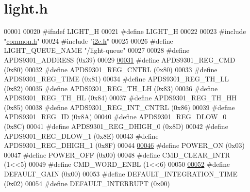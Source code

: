 \hypertarget{light_8h_source}{}\section{light.\+h}
\label{light_8h_source}

\begin{DoxyCode}
00001 
00020 \textcolor{preprocessor}{#ifndef LIGHT\_H}
00021 \textcolor{preprocessor}{#define LIGHT\_H}
00022 
00023 \textcolor{preprocessor}{#include "\hyperlink{common_8h}{common.h}"}
00024 \textcolor{preprocessor}{#include "\hyperlink{i2c_8h}{i2c.h}"}
00025 
00026 \textcolor{preprocessor}{#define LIGHT\_QUEUE\_NAME "/light-queue"}
00027 
00028 \textcolor{preprocessor}{#define APDS9301\_ADDRESS         (0x39)}
00029 
\hyperlink{light_8h_ac2e33218e7b5df546d974d0c766d8b0b}{00031} \textcolor{preprocessor}{#define APDS9301\_REG\_CMD         (0x80)}
00032 \textcolor{preprocessor}{#define APDS9301\_REG\_CNTRL       (0x80)}
00033 \textcolor{preprocessor}{#define APDS9301\_REG\_TIME        (0x81)}
00034 \textcolor{preprocessor}{#define APDS9301\_REG\_TH\_LL       (0x82)}
00035 \textcolor{preprocessor}{#define APDS9301\_REG\_TH\_LH       (0x83)}
00036 \textcolor{preprocessor}{#define APDS9301\_REG\_TH\_HL       (0x84)}
00037 \textcolor{preprocessor}{#define APDS9301\_REG\_TH\_HH       (0x85)}
00038 \textcolor{preprocessor}{#define APDS9301\_REG\_INT\_CNTRL   (0x86)}
00039 \textcolor{preprocessor}{#define APDS9301\_REG\_ID          (0x8A)}
00040 \textcolor{preprocessor}{#define APDS9301\_REG\_DLOW\_0      (0x8C)}
00041 \textcolor{preprocessor}{#define APDS9301\_REG\_DHIGH\_0     (0x8D)}
00042 \textcolor{preprocessor}{#define APDS9301\_REG\_DLOW\_1      (0x8E)}
00043 \textcolor{preprocessor}{#define APDS9301\_REG\_DHIGH\_1     (0x8F)}
00044 
\hyperlink{light_8h_a14cdc4396ca692461b59fb937003115b}{00046} \textcolor{preprocessor}{#define POWER\_ON     (0x03)}
00047 \textcolor{preprocessor}{#define POWER\_OFF    (0x00)}
00048 \textcolor{preprocessor}{#define CMD\_CLEAR\_INTR  (1<<5)}
00049 \textcolor{preprocessor}{#define CMD\_WORD\_ENBL   (1<<6)}
00050 
\hyperlink{light_8h_ae242ab0e0a91e95de561944085dbdf20}{00052} \textcolor{preprocessor}{#define DEFAULT\_GAIN             (0x00)   }
00053 \textcolor{preprocessor}{#define DEFAULT\_INTEGRATION\_TIME (0x02)   }
00054 \textcolor{preprocessor}{#define DEFAULT\_INTERRUPT        (0x00)   }

\end{DoxyCode}
